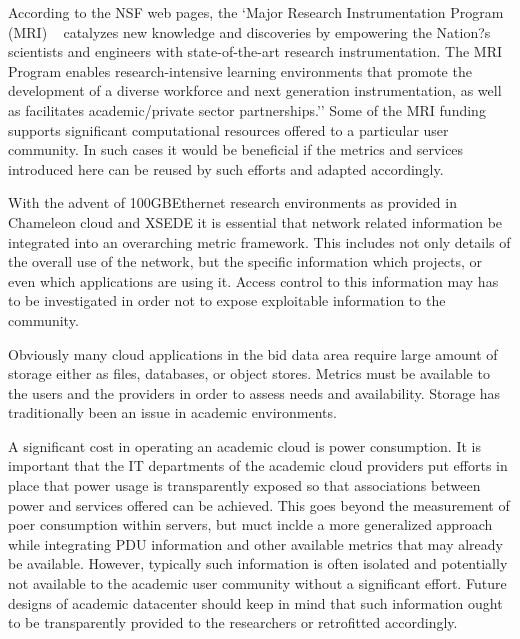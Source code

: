 \documentclass{sig-alternate-05-2015}
\begin{document}
\begin{description}
\setlength\itemsep{-2pt}

\item[\it MRIs.] According to the NSF web pages, the `Major Research
  Instrumentation Program (MRI) ~\cite{nsf-mri}  catalyzes new knowledge and
  discoveries by empowering the Nation?s scientists and engineers with
  state-of-the-art research instrumentation. The MRI Program enables
  research-intensive learning environments that promote the
  development of a diverse workforce and next generation
  instrumentation, as well as facilitates academic/private sector
  partnerships.'' Some of the MRI funding supports significant
  computational resources offered to a particular user community. In
  such cases it would be beneficial if the metrics and services
  introduced here can be reused by such efforts and adapted
  accordingly. 

\item[\it Networks.] With the advent of 100GBEthernet research
  environments as provided in Chameleon cloud and XSEDE it is
  essential that network related information be integrated into an
  overarching metric framework. This includes not only details of the
  overall use of the network, but the specific information which
  projects, or even which applications are using it. Access control to
  this information may has to be investigated in order not to expose
  exploitable information to the community.

\item[\it Storage.] Obviously many cloud applications in the bid data
  area require large amount of storage either as files, databases, or
  object stores. Metrics must be available to the users and the
  providers in order to assess needs and availability. Storage has
  traditionally been an issue in academic environments.

\item[\it Power.] A significant cost in operating an academic cloud is
  power consumption. It is important that the IT departments of the
  academic cloud providers put efforts in place that power usage is
  transparently exposed so that associations between power and
  services offered can be achieved. This goes beyond the measurement
  of poer consumption within servers, but muct inclde a more
  generalized approach while integrating PDU information and other
  available metrics that may already be available. However, typically
  such information is often isolated and potentially not available to
  the academic user community without a significant effort. Future
  designs of academic datacenter should keep in mind that such
  information ought to be transparently provided to the researchers or
  retrofitted accordingly.


\end{description}
\end{document}
